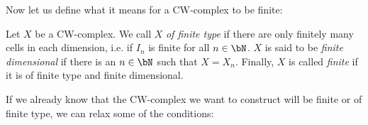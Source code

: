 Now let us define what it means for a CW-complex to be finite:

\begin{defi}
    Let $X$ be a CW-complex.
    We call $X$ \emph{of finite type} if there are only finitely many cells in each dimension, i.e. if $I_n$ is finite for all $n \in \bN$. 
    \href{https://github.com/scholzhannah/CWComplexes/blob/7be4872a05b534011cc969eb5b80a4b7f0bf57e2/CWcomplexes/Finite.lean#L33-L36}{\faExternalLink}
    $X$ is said to be \emph{finite dimensional} if there is an $n \in \bN$ such that $X = X_n$. 
    \href{https://github.com/scholzhannah/CWComplexes/blob/7be4872a05b534011cc969eb5b80a4b7f0bf57e2/CWcomplexes/Finite.lean#L28-L31}{\faExternalLink}
    Finally, $X$ is called \emph{finite} if it is of finite type and finite dimensional.
    \href{https://github.com/scholzhannah/CWComplexes/blob/7be4872a05b534011cc969eb5b80a4b7f0bf57e2/CWcomplexes/Finite.lean#L38-L43}{\faExternalLink}
\end{defi}

If we already know that the CW-complex we want to construct will be finite or of finite type, we can relax some of the conditions:

